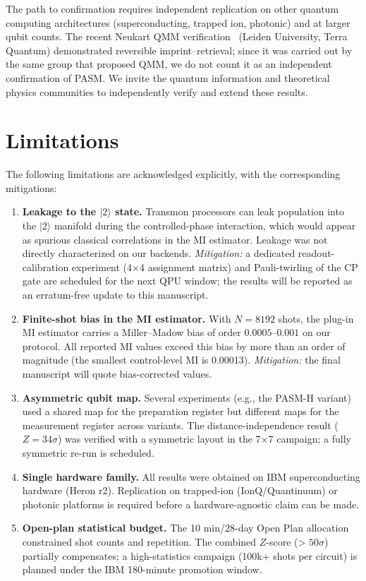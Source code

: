 \documentclass[12pt,a4paper]{article}
\begin{document}
The path to confirmation requires independent replication on other quantum computing architectures (superconducting, trapped ion, photonic) and at larger qubit counts. The recent Neukart QMM verification~\cite{neukart2026qip} (Leiden University, Terra Quantum) demonstrated reversible imprint--retrieval; since it was carried out by the same group that proposed QMM, we do not count it as an independent confirmation of PASM. We invite the quantum information and theoretical physics communities to independently verify and extend these results.

\section*{Limitations}

The following limitations are acknowledged explicitly, with the corresponding mitigations:

\begin{enumerate}
    \item \textbf{Leakage to the $|2\rangle$ state.} Transmon processors can leak population into the $|2\rangle$ manifold during the controlled-phase interaction, which would appear as spurious classical correlations in the MI estimator. Leakage was not directly characterized on our backends. \textit{Mitigation:} a dedicated readout-calibration experiment (4$\times$4 assignment matrix) and Pauli-twirling of the CP gate are scheduled for the next QPU window; the results will be reported as an erratum-free update to this manuscript.
    \item \textbf{Finite-shot bias in the MI estimator.} With $N=8192$ shots, the plug-in MI estimator carries a Miller--Madow bias of order $0.0005$--$0.001$ on our protocol. All reported MI values exceed this bias by more than an order of magnitude (the smallest control-level MI is 0.00013). \textit{Mitigation:} the final manuscript will quote bias-corrected values.
    \item \textbf{Asymmetric qubit map.} Several experiments (e.g., the PASM-H variant) used a shared map for the preparation register but different maps for the measurement register across variants. The distance-independence result ($Z = 34\sigma$) was verified with a symmetric layout in the 7$\times$7 campaign; a fully symmetric re-run is scheduled.
    \item \textbf{Single hardware family.} All results were obtained on IBM superconducting hardware (Heron r2). Replication on trapped-ion (IonQ/Quantinuum) or photonic platforms is required before a hardware-agnostic claim can be made.
    \item \textbf{Open-plan statistical budget.} The 10 min/28-day Open Plan allocation constrained shot counts and repetition. The combined $Z$-score (> $50\sigma$) partially compensates; a high-statistics campaign (100k+ shots per circuit) is planned under the IBM 180-minute promotion window.
\end{enumerate}
\end{document}
